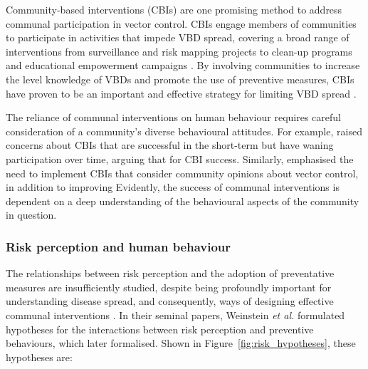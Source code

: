 Community-based interventions (CBIs) are one promising method to address communal participation in vector control. CBIs engage members of communities to participate in activities that impede VBD spread, covering a broad range of interventions from surveillance and risk mapping projects to clean-up programs and educational empowerment campaigns \cite{khun_community_2008, perez_realist_2021}. By involving communities to increase the level knowledge of VBDs and promote the use of preventive measures, CBIs have proven to be an important and effective strategy for limiting VBD spread \cite{rivera_adoption_2023, sulistyawati_dengue_2019, winch_effectiveness_1992}.

The reliance of communal interventions on human behaviour requires careful consideration of a community's diverse behavioural attitudes. For example, \citet{tapia-conyer_community_2012} raised concerns about CBIs that are successful in the short-term but have waning participation over time, arguing that  for CBI success. Similarly, \citet{sulistyawati_dengue_2019} emphasised the need to implement  CBIs that consider community opinions about vector control, in addition to improving  Evidently, the success of communal interventions is dependent on a deep understanding of the behavioural aspects of the community in question.


\subsubsection{Risk perception and human behaviour}\label{sec:risk-perception}

The relationships between risk perception and the adoption of preventative measures are insufficiently studied, despite being profoundly important for understanding disease spread, and consequently, ways of designing effective communal interventions \cite{williams_role_2010}. In their seminal papers, Weinstein \textit{et al.} \cite{weinstein_correct_1993, weinstein_use_1998} formulated hypotheses for the interactions between risk perception and preventive behaviours, which \citet{brewer_risk_2004} later formalised. Shown in Figure~\ref{fig:risk_hypotheses}, these hypotheses are:

